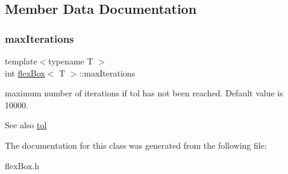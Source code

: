 \subsection{Member Data Documentation}
\mbox{\label{classflex_box_aa20a8abc40427d7a4b8c709f1e38318d}} 
\subsubsection{\texorpdfstring{max\+Iterations}{maxIterations}}
{\footnotesize\ttfamily template$<$typename T $>$ \\
int \hyperlink{classflex_box}{flex\+Box}$<$ T $>$\+::max\+Iterations}



maximum number of iterations if tol has not been reached. Default value is 10000. 

\begin{DoxySeeAlso}{See also}
\hyperlink{classflex_box_acd4f987e22eb761cff9f6c98592808b4}{tol} 
\end{DoxySeeAlso}


The documentation for this class was generated from the following file\+:\begin{DoxyCompactItemize}
\item 
flex\+Box.\+h\end{DoxyCompactItemize}
